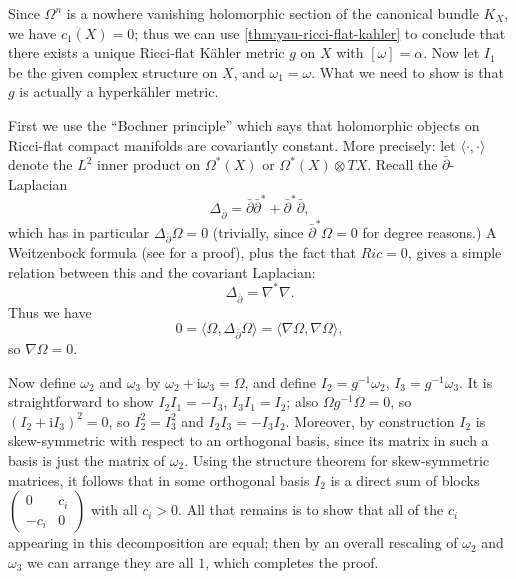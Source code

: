 \documentclass[12pt,letterpaper,reqno]{article}
\numberwithin{equation}{section}
\newcommand{\kahler}{K\"ahler\xspace}
\newcommand{\hk}{hyperk\"ahler\xspace}
\newcommand{\I}{{\mathrm i}}
\newcommand{\IP}[1]{\langle#1\rangle}
\begin{document}
\begin{pf} Since $\Omega^n$ is a nowhere vanishing
holomorphic section of the canonical bundle $K_X$,
we have $c_1(X) = 0$; thus we can use
\autoref{thm:yau-ricci-flat-kahler}
to conclude that there exists a unique Ricci-flat \kahler
metric $g$ on $X$ with $[\omega] = \alpha$.
Now let $I_1$ be the given complex structure on $X$,
and $\omega_1 = \omega$.
What we need to show is
that $g$ is actually a \hk metric.

First we use the ``Bochner principle'' which says that holomorphic
objects on Ricci-flat compact manifolds are covariantly constant. More precisely:
let $\IP{\cdot,\cdot}$ denote the $L^2$ inner product on $\Omega^*(X)$ or
$\Omega^*(X) \otimes TX$. Recall
the $\bar\partial$-Laplacian
\begin{equation}
  \Delta_{\bar \partial} = \bar\partial \bar\partial^* + \bar\partial^* \bar\partial,
\end{equation}
which has in particular $\Delta_{\bar \partial} \Omega = 0$ (trivially, since
$\bar\partial^* \Omega = 0$ for degree reasons.)
A Weitzenbock formula (see \cite{MR2325093} for a proof), plus the fact that
$Ric = 0$, gives a simple relation between this and the covariant Laplacian:
\begin{equation}
\Delta_{\bar\partial} = \nabla^* \nabla.
\end{equation}
Thus we have
\begin{equation}
  0 = \IP{\Omega, \Delta_{\bar \partial} \Omega} = \IP{\nabla\Omega,\nabla\Omega},
\end{equation}
so $\nabla \Omega = 0$.

Now define $\omega_2$ and $\omega_3$ by
$\omega_2 + \I \omega_3 = \Omega$, and define
$I_2 = g^{-1} \omega_2$, $I_3 = g^{-1} \omega_3$.
It is straightforward to show $I_2 I_1 = -I_3$, $I_3 I_1 = I_2$;
also $\Omega g^{-1} \Omega = 0$, so
$(I_2 + \I I_3)^2 = 0$, so $I_2^2 = I_3^2$ and
$I_2 I_3 = -I_3 I_2$.
Moreover, by construction $I_2$ is skew-symmetric with
respect to an orthogonal basis, since its matrix in such
a basis is just the matrix of $\omega_2$.
Using the structure theorem
for skew-symmetric matrices, it follows that in some
orthogonal basis $I_2$ is a direct sum of blocks
$\begin{pmatrix} 0 & c_i \\ -c_i & 0 \end{pmatrix}$ with all $c_i > 0$.
All that remains is to show that all of the $c_i$
appearing in this decomposition are equal;
then by an overall rescaling of $\omega_2$
and $\omega_3$ we can arrange they are all $1$,
which completes the proof.


\end{pf}
\end{document}
